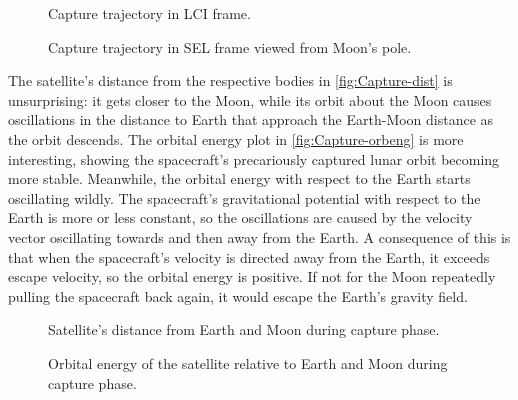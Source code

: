 \begin{figure}
\caption{Capture trajectory in LCI frame.} \label{fig:Capture-3D-lci}
\centering
\def\svgwidth{\figurewidth}

\end{figure}

\begin{figure}
\caption{Capture trajectory in SEL frame viewed from Moon's pole.} \label{fig:Capture-3D-sel}
\centering
\def\svgwidth{\figurewidth}

\end{figure}

%

The satellite's distance from the respective bodies in \autoref{fig:Capture-dist} is unsurprising: it gets closer to the Moon, while its orbit about the Moon causes oscillations in the distance to Earth that approach the Earth-Moon distance as the orbit descends. The orbital energy plot in \autoref{fig:Capture-orbeng} is more interesting, showing the spacecraft's precariously captured lunar orbit becoming more stable. Meanwhile, the orbital energy with respect to the Earth starts oscillating wildly. The spacecraft's gravitational potential with respect to the Earth is more or less constant, so the oscillations are caused by the velocity vector oscillating towards and then away from the Earth. A consequence of this is that when the spacecraft's velocity is directed away from the Earth, it exceeds escape velocity, so the orbital energy is positive. If not for the Moon repeatedly pulling the spacecraft back again, it would escape the Earth's gravity field.

\begin{figure}
\caption{Satellite's distance from Earth and Moon during capture phase.} \label{fig:Capture-dist}
\centering
\def\svgwidth{\figurewidth}

\end{figure}

\begin{figure}
\centering
\def\svgwidth{\figurewidth}

\caption{Orbital energy of the satellite relative to Earth and Moon during capture phase.} \label{fig:Capture-orbeng}
\end{figure}

